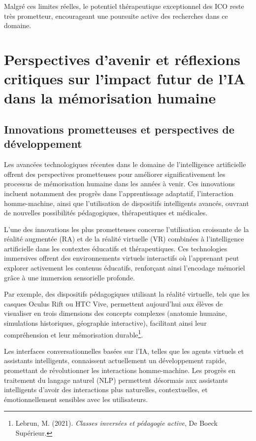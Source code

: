 \documentclass[12pt,a4paper]{report}
\begin{document}
Malgré ces limites réelles, le potentiel thérapeutique exceptionnel des ICO reste très prometteur, encourageant une poursuite active des recherches dans ce domaine.

\section{Perspectives d’avenir et réflexions critiques sur l’impact futur de l’IA dans la mémorisation humaine}

\subsection{Innovations prometteuses et perspectives de développement}

Les avancées technologiques récentes dans le domaine de l’intelligence artificielle offrent des perspectives prometteuses pour améliorer significativement les processus de mémorisation humaine dans les années à venir. Ces innovations incluent notamment des progrès dans l’apprentissage adaptatif, l’interaction homme-machine, ainsi que l’utilisation de dispositifs intelligents avancés, ouvrant de nouvelles possibilités pédagogiques, thérapeutiques et médicales.

L’une des innovations les plus prometteuses concerne l’utilisation croissante de la réalité augmentée (RA) et de la réalité virtuelle (VR) combinées à l’intelligence artificielle dans les contextes éducatifs et thérapeutiques. Ces technologies immersives offrent des environnements virtuels interactifs où l’apprenant peut explorer activement les contenus éducatifs, renforçant ainsi l’encodage mémoriel grâce à une immersion sensorielle profonde.

Par exemple, des dispositifs pédagogiques utilisant la réalité virtuelle, tels que les casques Oculus Rift ou HTC Vive, permettent aujourd’hui aux élèves de visualiser en trois dimensions des concepts complexes (anatomie humaine, simulations historiques, géographie interactive), facilitant ainsi leur compréhension et leur mémorisation durable\footnote{Lebrun, M. (2021). \textit{Classes inversées et pédagogie active}, De Boeck Supérieur.}.

Les interfaces conversationnelles basées sur l’IA, telles que les agents virtuels et assistants intelligents, connaissent actuellement un développement rapide, promettant de révolutionner les interactions homme-machine. Les progrès en traitement du langage naturel (NLP) permettent désormais aux assistants intelligents d’avoir des interactions plus naturelles, contextuelles, et émotionnellement sensibles avec les utilisateurs.
\end{document}
